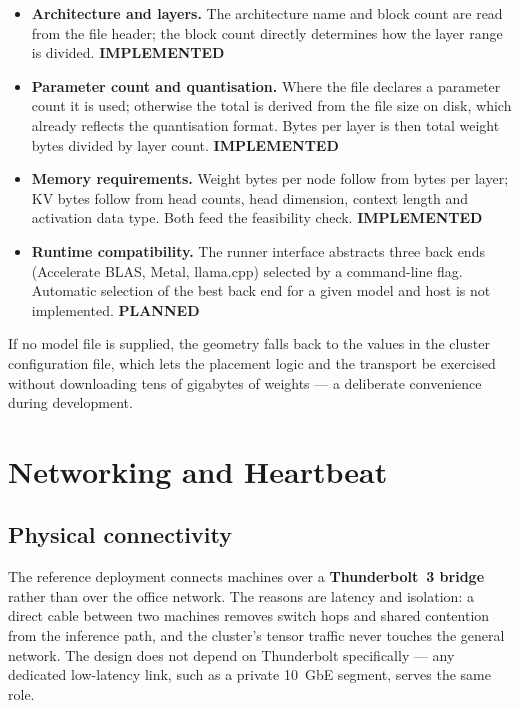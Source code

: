 \documentclass[11pt,a4paper]{article}
\newcommand{\stImp}{\textcolor{ogreen}{\footnotesize\textsf{\textbf{IMPLEMENTED}}}}
\newcommand{\stPlan}{\textcolor{oblue}{\footnotesize\textsf{\textbf{PLANNED}}}}
\begin{document}
\begin{itemize}
  \item \textbf{Architecture and layers.} The architecture name and block count
        are read from the file header; the block count directly determines how
        the layer range is divided. \stImp
  \item \textbf{Parameter count and quantisation.} Where the file declares a
        parameter count it is used; otherwise the total is derived from the file
        size on disk, which already reflects the quantisation format. Bytes per
        layer is then total weight bytes divided by layer count. \stImp
  \item \textbf{Memory requirements.} Weight bytes per node follow from bytes per
        layer; KV bytes follow from head counts, head dimension, context length
        and activation data type. Both feed the feasibility check. \stImp
  \item \textbf{Runtime compatibility.} The runner interface abstracts three back
        ends (Accelerate BLAS, Metal, llama.cpp) selected by a command-line flag.
        Automatic selection of the best back end for a given model and host is
        not implemented. \stPlan
\end{itemize}

If no model file is supplied, the geometry falls back to the values in the
cluster configuration file, which lets the placement logic and the transport be
exercised without downloading tens of gigabytes of weights --- a deliberate
convenience during development.

\section{Networking and Heartbeat}

\subsection{Physical connectivity}

The reference deployment connects machines over a \textbf{Thunderbolt~3 bridge}
rather than over the office network. The reasons are latency and isolation: a
direct cable between two machines removes switch hops and shared contention from
the inference path, and the cluster's tensor traffic never touches the general
network. The design does not depend on Thunderbolt specifically --- any dedicated
low-latency link, such as a private 10~GbE segment, serves the same role.
\end{document}
